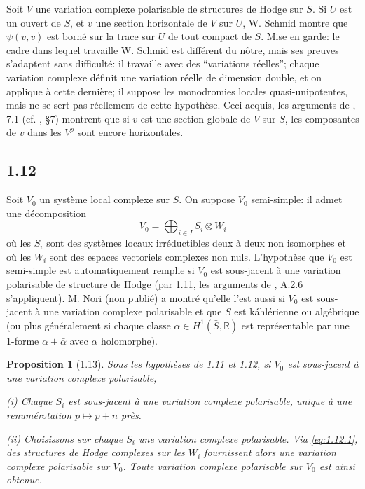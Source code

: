 \documentclass[12pt,a4paper]{article}
\theoremstyle{plain}
\newtheorem{proposition}{Proposition}[section]
\theoremstyle{definition}
\newcommand{\RR}{\mathbb{R}}
\begin{document}
Soit $V$ une variation complexe polarisable de structures de Hodge sur $S$. Si $U$ est un ouvert de $S$, et $v$ une section horizontale de $V$ sur $U$, W. Schmid \cite{Schmid} montre que $\psi(v,v)$ est born\'{e} sur la trace sur $U$ de tout compact de $\bar{S}$. Mise en garde: le cadre dans lequel travaille W. Schmid est diff\'{e}rent du n\^{o}tre, mais ses preuves s'adaptent sans difficult\'{e}: il travaille avec des ``variations r\'{e}elles''; chaque variation complexe d\'{e}finit une variation r\'{e}elle de dimension double, et on applique \cite{Schmid} \`{a} cette derni\`{e}re; il suppose les monodromies locales quasi-unipotentes, mais ne se sert pas r\'{e}ellement de cette hypoth\`{e}se. Ceci acquis, les arguments de \cite{GriffithsIII}, 7.1 (cf. \cite{Schmid}, \S7) montrent que si $v$ est une section globale de $V$ sur $S$, les composantes de $v$ dans les $V^{p}$ sont encore horizontales.

\subsection*{1.12}
Soit $V_{0}$ un syst\`{e}me local complexe sur $S$. On suppose $V_{0}$ semi-simple: il admet une d\'{e}composition
\begin{equation}\label{eq:1.12.1}
V_{0} = \bigoplus_{i \in I} S_{i} \otimes W_{i}
\end{equation}
o\`{u} les $S_{i}$ sont des syst\`{e}mes locaux irr\'{e}ductibles deux \`{a} deux non isomorphes et o\`{u} les $W_{i}$ sont des espaces vectoriels complexes non nuls. L'hypoth\`{e}se que $V_{0}$ est semi-simple est automatiquement remplie si $V_{0}$ est sous-jacent \`{a} une variation polarisable de structure de Hodge (par 1.11, les arguments de \cite{HodgeII}, A.2.6 s'appliquent). M. Nori (non publi\'{e}) a montr\'{e} qu'elle l'est aussi si $V_{0}$ est sous-jacent \`{a} une variation complexe polarisable et que $S$ est k\'{a}hl\'{e}rienne ou alg\'{e}brique (ou plus g\'{e}n\'{e}ralement si chaque classe $\alpha \in H^{1}(\bar{S}, \RR)$ est repr\'{e}sentable par une 1-forme $\alpha + \bar{\alpha}$ avec $\alpha$ holomorphe).

\begin{proposition}[1.13]
Sous les hypoth\`{e}ses de 1.11 et 1.12, si $V_{0}$ est sous-jacent \`{a} une variation complexe polarisable,

\textup{(i)} Chaque $S_{i}$ est sous-jacent \`{a} une variation complexe polarisable, unique \`{a} une renum\'{e}rotation $p \mapsto p + n$ pr\`{e}s.

\textup{(ii)} Choisissons sur chaque $S_{i}$ une variation complexe polarisable. Via \eqref{eq:1.12.1}, des structures de Hodge complexes sur les $W_{i}$ fournissent alors une variation complexe polarisable sur $V_{0}$. Toute variation complexe polarisable sur $V_{0}$ est ainsi obtenue.
\end{proposition}
\end{document}
